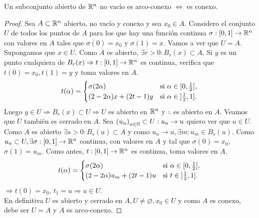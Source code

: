 \begin{theorem}
  Un subconjunto abierto de \(\mathbb{R}^n\) no vacío es arco-conexo \(\iff \) es conexo.

  \begin{proof}
    Sea \(A \subset \mathbb{R}^n\) abierto, no vacío y conexo y sea \(x_0 \in A\). Considero el conjunto \(U\) de todos los puntos de \(A\) para los que hay una función continua \(\sigma: [0, 1] \to \mathbb{R}^n\) con valores en \(A\) tales que \(\sigma(0) = x_0\) y \(\sigma(1) = x\). Vamos a ver que \(U = A\). \\
    Supongamos que \(x \in U\). Como \(A\) es abierto, \(\exists r > 0 : B_r(x) \subset A\). Si \(y\) es un punto cualquiera de \(B_r(x) \Rightarrow t: [0, 1] \to \mathbb{R}^n\) es continua, verifica que \(t(0) = x_0, t(1) = y\) y toma valores en \(A\).
    \begin{align*}
      t(\alpha) = \begin{cases}
                    \sigma(2\alpha)           & \text{si } \alpha \in [0, \frac{1}{2}], \\
                    (2 - 2 \alpha)x + (2t-1)y & \text{si } \alpha \in  \interval[open left]{\frac{1}{2}}{1}.
                  \end{cases}
    \end{align*} Luego \(y \in U \Rightarrow B_r(x) \subset U \Rightarrow U\) es abierto en \(\mathbb{R}^n\) y \(\therefore \) es abierto en \(A\). Veamos que \(U\) también es cerrado en \(A\). Sea \({(u_n)}_{n \in \mathbb{N}} \subset U : u_n \to u\) quiero ver que \(u \in U\). Como \(A\) es abierto \(\exists s > 0 : B_s(u) \subset A\) y como \(u_n \to u, \exists m : u_m \in B_s(u)\). Como \(u_n \subset U, \exists \sigma: [0, 1] \to \mathbb{R}^n\) continua, con valores en \(A\) y tal que \(\sigma(0) = x_0\), \(\sigma(1) = u_m\). Como antes, \(t: [0, 1] \to \mathbb{R}^n\) es continua, toma valores en \(A\).
    \begin{align*} t(\alpha) = \begin{cases}
                    \sigma(2\alpha)                & \text{si } \alpha \in [0, \frac{1}{2}], \\
                    (2 - 2\alpha) u_m + (2t - 1) u & \text{si } t \in \interval[open left]{\frac{1}{2}}{1}.
                  \end{cases}
    \end{align*}\(\Rightarrow t(0) = x_0\), \(t_1 = u \Rightarrow u \in U\). \\
    En definitiva \(U\) es abierto y cerrado en \(A, U \neq \varnothing, x_0 \in U\) y como \(A\) es conexo, debe ser \(U = A\) y \(A\) es arco-conexo.
  \end{proof}
\end{theorem}

